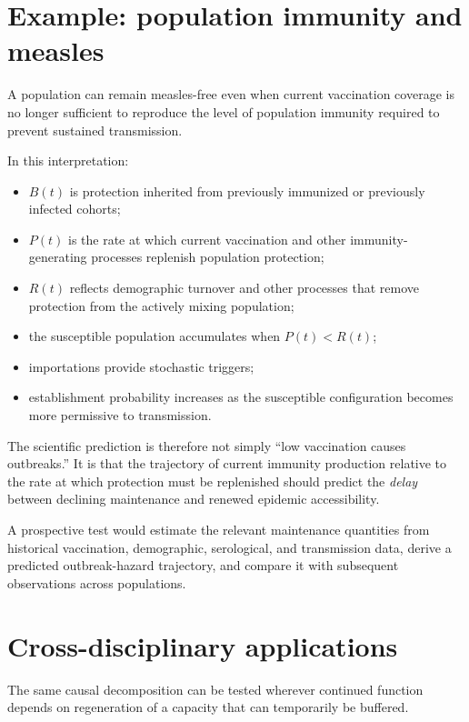 \documentclass[11pt,a4paper]{article}
\begin{document}
\section{Example: population immunity and measles}

A population can remain measles-free even when current vaccination coverage is no longer sufficient to reproduce the level of population immunity required to prevent sustained transmission.

In this interpretation:
\begin{itemize}[nosep]
    \item $B(t)$ is protection inherited from previously immunized or previously infected cohorts;
    \item $P(t)$ is the rate at which current vaccination and other immunity-generating processes replenish population protection;
    \item $R(t)$ reflects demographic turnover and other processes that remove protection from the actively mixing population;
    \item the susceptible population accumulates when $P(t)<R(t)$;
    \item importations provide stochastic triggers;
    \item establishment probability increases as the susceptible configuration becomes more permissive to transmission.
\end{itemize}

The scientific prediction is therefore not simply ``low vaccination causes outbreaks.'' It is that the trajectory of current immunity production relative to the rate at which protection must be replenished should predict the \emph{delay} between declining maintenance and renewed epidemic accessibility.

A prospective test would estimate the relevant maintenance quantities from historical vaccination, demographic, serological, and transmission data, derive a predicted outbreak-hazard trajectory, and compare it with subsequent observations across populations.

\section{Cross-disciplinary applications}

The same causal decomposition can be tested wherever continued function depends on regeneration of a capacity that can temporarily be buffered.
\end{document}
